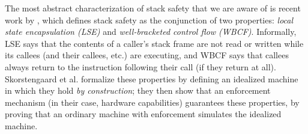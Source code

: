 \documentclass[acmsmall,review,anonymous]{acmart}\settopmatter{printfolios=true,printccs=false,printacmref=false}
\begin{document}
The most abstract characterization of stack safety that we are aware of is
recent work by \citet{SkorstengaardSTK}, which defines stack safety as the conjunction of two
properties:
{\em local state encapsulation (LSE)} and {\em well-bracketed control flow (WBCF)}.
Informally, LSE says that the contents of
a caller's stack frame are not read or written while its callees (and their callees, etc.) are
executing, and WBCF says that callees always
return to the instruction following their call (if they return at all).
Skorstengaard et al.{} formalize these properties by defining an idealized
machine in which they hold {\em by construction};
they then show that an enforcement
mechanism (in their case, hardware capabilities) guarantees these properties, by
proving that an ordinary machine with enforcement simulates the idealized
machine.
\end{document}
